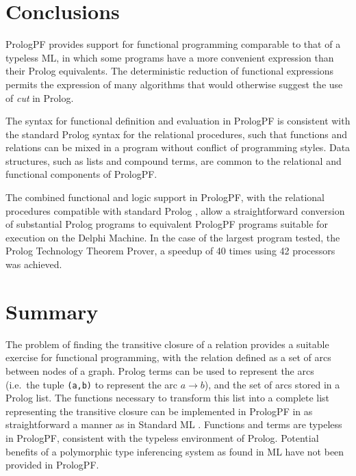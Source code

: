 \section{Conclusions} %

PrologPF provides support for functional programming comparable to that of a typeless ML,
in which some programs have a more convenient expression than their Prolog equivalents.  The
deterministic reduction of functional expressions permits the expression of many algorithms
that would otherwise suggest the use of \textit{cut} in Prolog.

The syntax for functional definition and evaluation in PrologPF is consistent with the
standard Prolog syntax for the relational procedures, such that functions and relations
can be mixed in a program without conflict of programming styles.  Data structures, such
as lists and compound terms, are common to the relational and functional components of
PrologPF.

The combined functional and logic support in PrologPF, with the relational procedures
compatible with standard Prolog \cite{DEDC96}, allow a straightforward conversion of
substantial Prolog programs to equivalent PrologPF programs suitable for execution on
the Delphi Machine.  In the case of the largest program tested, the Prolog Technology
Theorem Prover, a speedup of 40 times using 42 processors was achieved.

\section{Summary} %

The problem of finding the transitive closure of a relation provides a suitable
exercise for functional programming, with the relation defined as a set of arcs between
nodes of a graph.  Prolog terms can be used to represent the arcs (i.e.\ the tuple
\texttt{(a,b)} to represent the arc $a\rightarrow b$), and the set of arcs stored in
a Prolog list.  The functions necessary to transform this list into a complete list
representing the transitive closure can be implemented in PrologPF in as straightforward
a manner as in Standard ML \cite{MTH90}.  Functions and terms are typeless in PrologPF,
consistent with the typeless environment of Prolog.  Potential benefits of a polymorphic
type inferencing system as found in ML have not been provided in PrologPF.

